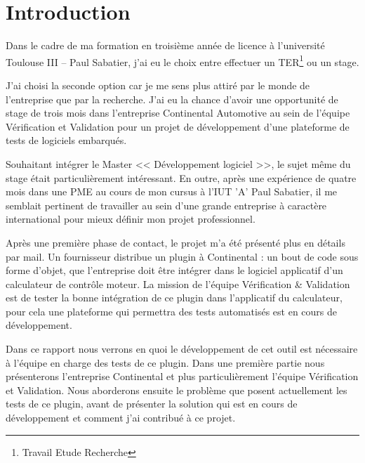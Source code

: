 \chapter*{Introduction}
Dans le cadre de ma formation en troisième année de licence à l'université Toulouse III – Paul Sabatier, j'ai eu le choix entre effectuer un TER\footnote{Travail Etude Recherche} ou un stage. 

J'ai choisi la seconde option car je me sens plus attiré par le monde de l'entreprise que par la recherche. J'ai eu la chance d'avoir une opportunité de stage de trois mois dans l'entreprise Continental Automotive au sein de l'équipe Vérification et Validation pour un projet de développement d'une plateforme de tests de logiciels embarqués.

Souhaitant intégrer le Master << Développement logiciel >>, le sujet même du stage était particulièrement intéressant. En outre, après une expérience de quatre mois dans une PME au cours de mon cursus à l'IUT 'A' Paul Sabatier, il me semblait pertinent de travailler au sein d'une grande entreprise à caractère international pour mieux définir mon projet professionnel.

Après une première phase de contact, le projet m'a été présenté plus en détails par mail. Un fournisseur distribue un plugin à Continental : un bout de code sous
forme d'objet, que l'entreprise doit être intégrer dans le logiciel applicatif d'un calculateur de contrôle moteur. La mission de l'équipe Vérification \&
Validation est de tester la bonne intégration de ce plugin dans l'applicatif du calculateur, pour cela une plateforme qui permettra des tests automatisés est en
cours de développement.

Dans ce rapport nous verrons en quoi le développement de cet outil est nécessaire à l'équipe en charge des tests de ce plugin. Dans une première partie nous présenterons l'entreprise Continental et plus particulièrement l'équipe Vérification et Validation. Nous aborderons ensuite le problème que posent actuellement les tests de ce plugin, avant de présenter la solution qui est en cours de développement et comment j'ai contribué à ce projet.
